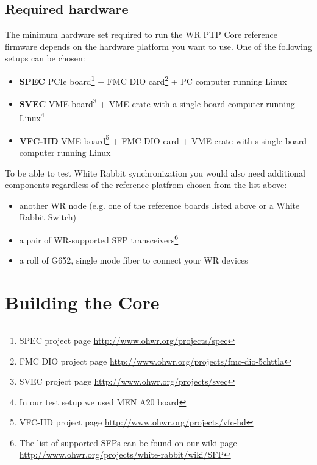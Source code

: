 \documentclass[a4paper, 12pt]{article}
\begin{document}
\subsection{Required hardware}
\label{Required hardware}

The minimum hardware set required to run the WR PTP Core reference firmware
depends on the hardware platform you want to use. One of the following setups
can be chosen:
\begin{itemize}
  \item {\bf SPEC} PCIe board\footnote{SPEC project page
    \url{http://www.ohwr.org/projects/spec}} + FMC DIO
    card\footnote{\label{note_dio}FMC DIO project page
    \url{http://www.ohwr.org/projects/fmc-dio-5chttla}} + PC computer running
    Linux
  
  \item  {\bf SVEC} VME board\footnote{SVEC project page
    \url{http://www.ohwr.org/projects/svec}} + VME crate with a single board
    computer running Linux\footnote{\label{note_a20}In our test setup we used MEN A20 board}

  \item {\bf VFC-HD} VME board\footnote{VFC-HD project page
    \url{http://www.ohwr.org/projects/vfc-hd}} + FMC DIO card
    + VME crate with s single board computer running Linux

\end{itemize}

To be able to test White Rabbit synchronization you would also need
additional components regardless of the reference platfrom chosen from the list
above:
\begin{itemize}
  \item another WR node (e.g. one of the reference boards listed above or a
    White Rabbit Switch)
  \item a pair of WR-supported SFP transceivers\footnote{The list of supported
    SFPs can be found on our wiki page
    \url{http://www.ohwr.org/projects/white-rabbit/wiki/SFP}}
  \item a roll of G652, single mode fiber to connect your WR devices
\end{itemize}

\newpage
\section{Building the Core}
\label{Building the Core}
\end{document}
